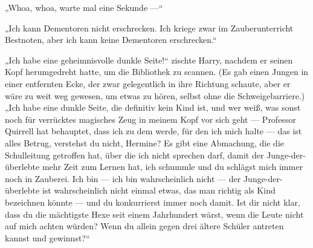 „Whoa, whoa, warte mal eine Sekunde —“

„Ich kann Dementoren nicht erschrecken. Ich kriege zwar im Zauberunterricht Bestnoten, aber ich kann keine Dementoren erschrecken.“

„Ich habe eine geheimnisvolle dunkle Seite!“ zischte Harry, nachdem er seinen Kopf herumgedreht hatte, um die Bibliothek zu scannen. (Es gab einen Jungen in einer entfernten Ecke, der zwar gelegentlich in ihre Richtung schaute, aber er wäre zu weit weg gewesen, um etwas zu hören, selbst ohne die Schweigebarriere.)
„Ich habe eine dunkle Seite, die definitiv kein Kind ist, und wer weiß, was sonst noch für verrücktes magisches Zeug in meinem Kopf vor sich geht — Professor Quirrell hat behauptet, dass ich zu dem werde, für den ich mich halte — das ist alles Betrug, verstehst du nicht, Hermine? Es gibt eine Abmachung, die die Schulleitung getroffen hat, über die ich nicht sprechen darf, damit der Junge-der-überlebte mehr Zeit zum Lernen hat, ich schummle und du schlägst mich immer noch in Zauberei. Ich bin — ich bin wahrscheinlich nicht — der Junge-der-überlebte ist wahrscheinlich nicht einmal etwas, das man richtig als Kind bezeichnen könnte — und du konkurrierst immer noch damit. Ist dir nicht klar, dass du die mächtigste Hexe seit einem Jahrhundert wärst, wenn die Leute nicht auf mich achten würden? Wenn du allein gegen drei ältere Schüler antreten kannst und gewinnst?“

